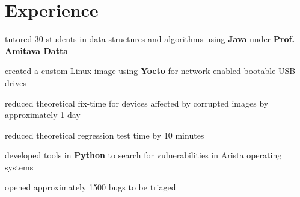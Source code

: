 \documentclass[a4paper]{style}
\begin{document}
\begin{minipage}[t]{0.54\textwidth}
\sectionspace{}


\section{Experience}

    \vspace{-1pt}
    \begin{tightitemize}
        \item tutored 30 students in data structures and algorithms using \textbf{Java} under \href{https://research-repository.uwa.edu.au/en/persons/amitava-datta}{\textbf{Prof. Amitava Datta}}
    \end{tightitemize}
\sectionspace{}

\vspace{-1pt}
\begin{tightitemize}
    \item created a custom Linux image using \textbf{Yocto} for network enabled bootable USB drives
        \vspace{2pt}
        \begin{tightitemize}
            \item reduced theoretical fix-time for devices affected by corrupted images by approximately 1 day
            \item reduced theoretical regression test time by 10 minutes
        \end{tightitemize}
        \vspace{1pt}
    \item developed tools in \textbf{Python} to search for vulnerabilities in Arista operating systems
        \vspace{2pt}
        \begin{tightitemize}
            \item opened approximately 1500 bugs to be triaged
        \end{tightitemize}
\end{tightitemize}
\sectionspace{} %


\end{minipage}
\end{document}
